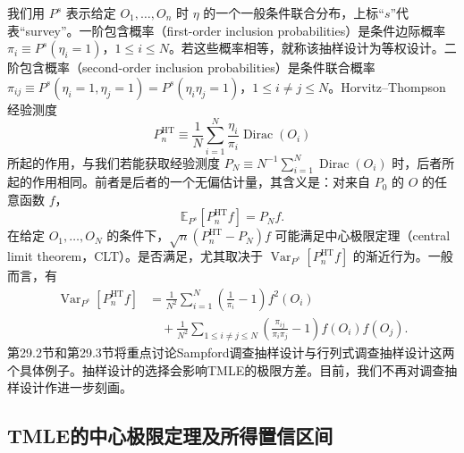 我们用 $P^s$ 表示给定 $O_1,\ldots,O_n$ 时 $\eta$ 的一个一般条件联合分布，上标“$s$”代表“survey”。一阶包含概率（first-order inclusion probabilities）是条件边际概率 $\pi_i\equiv P^s(\eta_i=1)$，$1\le i\le N$。若这些概率相等，就称该抽样设计为等权设计。二阶包含概率（second-order inclusion probabilities）是条件联合概率 $\pi_{ij}\equiv P^s(\eta_i=1,\eta_j=1)=P^s(\eta_i\eta_j=1)$，$1\le i\ne j\le N$。Horvitz--Thompson经验测度
\begin{equation}
P_n^{\mathrm{HT}}\equiv\frac1N\sum_{i=1}^N\frac{\eta_i}{\pi_i}\operatorname{Dirac}(O_i)
\tag{29.1}
\end{equation}
所起的作用，与我们若能获取经验测度 $P_N\equiv N^{-1}\sum_{i=1}^N\operatorname{Dirac}(O_i)$ 时，后者所起的作用相同。前者是后者的一个无偏估计量，其含义是：对来自 $P_0$ 的 $O$ 的任意函数 $f$，
\[
\mathbb E_{P^s}\!\left[P_n^{\mathrm{HT}}f\right]=P_Nf.
\]
在给定 $O_1,\ldots,O_N$ 的条件下，$\sqrt n(P_n^{\mathrm{HT}}-P_N)f$ 可能满足中心极限定理（central limit theorem，CLT）。是否满足，尤其取决于 $\operatorname{Var}_{P^s}[P_n^{\mathrm{HT}}f]$ 的渐近行为。一般而言，有
\begin{equation}
\begin{aligned}
\operatorname{Var}_{P^s}\!\left[P_n^{\mathrm{HT}}f\right]
&=\frac1{N^2}\sum_{i=1}^N\left(\frac1{\pi_i}-1\right)f^2(O_i)\\
&\quad+\frac1{N^2}\sum_{1\le i\ne j\le N}
\left(\frac{\pi_{ij}}{\pi_i\pi_j}-1\right)f(O_i)f(O_j).
\end{aligned}
\tag{29.2}
\end{equation}
第29.2节和第29.3节将重点讨论Sampford调查抽样设计与行列式调查抽样设计这两个具体例子。抽样设计的选择会影响TMLE的极限方差。目前，我们不再对调查抽样设计作进一步刻画。

\subsection{TMLE的中心极限定理及所得置信区间}

